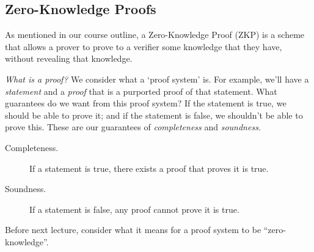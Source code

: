 \subsection{Zero-Knowledge Proofs}
As mentioned in our course outline, a Zero-Knowledge Proof (ZKP) is a scheme that allows a prover to prove to a verifier some knowledge that they have, without revealing that knowledge.

\emph{What is a proof?} We consider what a `proof system' is. For example, we'll have a \emph{statement} and a \emph{proof} that is a purported proof of that statement. What guarantees do we want from this proof system? If the statement is true, we should be able to prove it; and if the statement is false, we shouldn't be able to prove this. These are our guarantees of \emph{completeness} and \emph{soundness}.
\begin{description}
    \item[Completeness.] If a statement is true, there exists a proof that proves it is true.
    \item[Soundness.] If a statement is false, any proof cannot prove it is true.
\end{description}

Before next lecture, consider what it means for a proof system to be ``zero-knowledge''.
